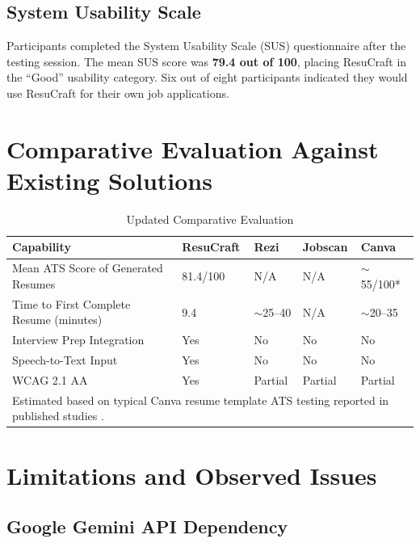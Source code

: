 \documentclass[12pt, a4paper, oneside]{report}
\begin{document}
\subsection{System Usability Scale}

Participants completed the System Usability Scale (SUS) questionnaire \cite{sus1996} after the testing session. The mean SUS score was \textbf{79.4 out of 100}, placing ResuCraft in the ``Good'' usability category. Six out of eight participants indicated they would use ResuCraft for their own job applications.

\section{Comparative Evaluation Against Existing Solutions}

\begin{table}[H]
\centering
\caption{Updated Comparative Evaluation}
\label{tab:updated_comparison}
\renewcommand{\arraystretch}{1.4}
\begin{tabularx}{\textwidth}{|X|p{2cm}|p{2cm}|p{2cm}|p{2cm}|}
\hline
\textbf{Capability} & \textbf{ResuCraft} & \textbf{Rezi} & \textbf{Jobscan \cite{jobscan2021}} & \textbf{Canva} \\
\hline
Mean ATS Score of Generated Resumes & 81.4/100 & N/A & N/A & $\sim$55/100* \\
\hline
Time to First Complete Resume (minutes) & 9.4 & $\sim$25--40 & N/A & $\sim$20--35 \\
\hline
Interview Prep Integration & Yes & No & No & No \\
\hline
Speech-to-Text Input \cite{sears2003} & Yes & No & No & No \\
\hline
WCAG 2.1 AA \cite{wcag21} & Yes & Partial & Partial & Partial \\
\hline
\multicolumn{5}{l}{\footnotesize *Estimated based on typical Canva resume template ATS testing reported in published studies \cite{resumeworded2022}.} \\
\end{tabularx}
\end{table}

\section{Limitations and Observed Issues}

\subsection{Google Gemini API Dependency}
\end{document}
